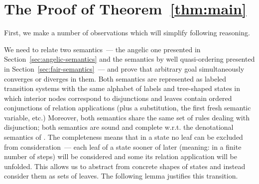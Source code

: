 \appendix

\section{The Proof of Theorem~\ref{thm:main}}
\label{sec:app}

First, we make a number of observations which will simplify following reasoning.

We need to relate two semantics~--- the angelic one presented in Section~\ref{sec:angelic-semantics} and
the semantics by well quasi-ordering presented in Section~\ref{sec:fair-semantics}~--- and prove that
arbitrary goal simultaneously converges or diverges in them. Both semantics are represented
as labeled transition systems with the same alphabet of labels and tree-shaped states in which interior
nodes correspond to disjunctions and leaves contain ordered conjunctions of relation applications (plus a
substitution, the first fresh semantic variable, etc.) Moreover, both semantics share the same
set of rules dealing with disjunction; both semantics are sound and complete w.r.t. the denotational
semantics of \mk. The completeness means that in a state no leaf can be excluded from consideration~---
each leaf of a state sooner of later (meaning: in a finite number of steps) will be considered and some
its relation application will be unfolded. This allows us to abstract from concrete shapes of states and
instead consider them as sets of leaves. The following lemma justifies this transition.

